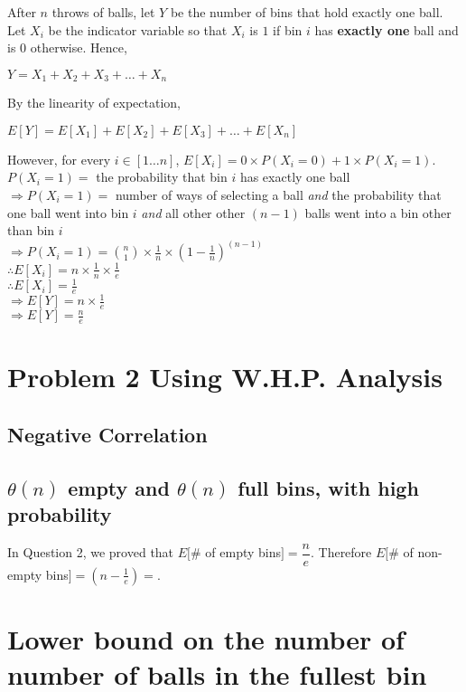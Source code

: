 \documentclass{article}
\begin{document}
After $n$ throws of balls, let $Y$ be the number of bins that hold
exactly one ball. Let $X_i$ be the indicator variable so that $X_i$ is
$1$ if bin $i$ has \textbf{exactly one} ball and is $0$
otherwise. Hence,

$Y = X_1 + X_2 + X_3 + \ldots{} + X_n$

By the linearity of expectation,

$E[Y] = E[X_1] + E[X_2] + E[X_3] + \ldots{} + E[X_n]$

However, for every $i \in [1\ldots{}n]$, $E[X_i] = 0 \times P(X_i = 0)
+ 1 \times P(X_i = 1)$.\\
$P(X_i = 1) = $ the probability that bin $i$ has exactly one ball\\
$\Rightarrow P(X_i = 1) = $ number of ways of selecting a ball \textit{and} the probability that one ball went into
bin $i$ \textit{and} all other other $(n-1)$ balls went into a bin other than
bin $i$\\
$\Rightarrow P(X_i = 1) = \binom{n}{1} \times \frac{1}{n} \times (1 - \frac{1}{n})^{(n-1)}$\\
$\therefore E[X_i] = n \times \frac{1}{n} \times \frac{1}{e}$\\
$\therefore E[X_i] = \frac{1}{e}$\\
$\Rightarrow E[Y] = n \times \frac{1}{e}$\\
$\Rightarrow E[Y] = \frac{n}{e}$

\clearpage

\section {Problem 2 Using W.H.P. Analysis}

\subsection{Negative Correlation}

\subsection{$\theta(n)$ empty and $\theta(n)$ full bins, with high probability}
In Question 2, we proved that $E[$\# of empty bins$] = \dfrac{n}{e}$. Therefore
$E[$\# of non-empty bins$] = \left(n-\frac{1}{e}\right) = $.
\clearpage

\section {Lower bound on the number of number of balls in the fullest bin}
\end{document}
